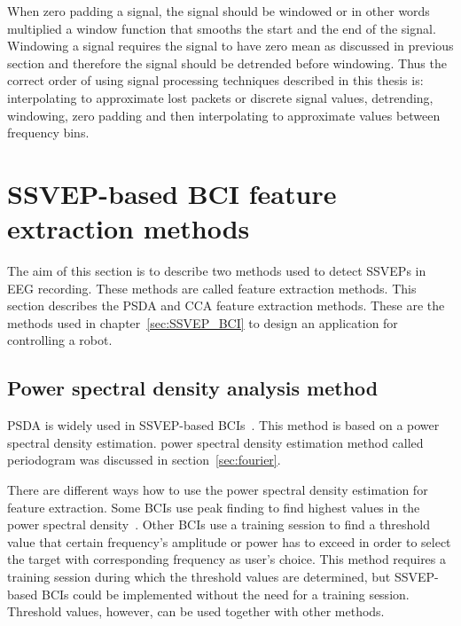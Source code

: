 When zero padding a signal, the signal should be windowed or in other words multiplied a window function that smooths the start and the end of the signal. Windowing a signal requires the signal to have zero mean as discussed in previous section and therefore the signal should be detrended before windowing. Thus the correct order of using signal processing techniques described in this thesis is: interpolating to approximate lost packets or discrete signal values, detrending, windowing, zero padding and then interpolating to approximate values between \glspl{frequency bin}.

\section{SSVEP-based BCI feature extraction methods}
\label{sec:SSVEP_detection}
The aim of this section is to describe two methods used to detect \glspl{SSVEP} in \gls{EEG} recording. These methods are called \gls{feature extraction} methods. This section describes the \gls{PSDA} and \gls{CCA} \gls{feature extraction} methods. These are the methods used in chapter~\ref{sec:SSVEP_BCI} to design an application for controlling a robot. %

\subsection{Power spectral density analysis method}

\Gls{PSDA} is widely used in \gls{SSVEP}-based \glspl{BCI}~\cite{bin2009cca}. This method is based on a \gls{power spectral density} estimation. \Gls{power spectral density} estimation method called \gls{periodogram} was discussed in section~\ref{sec:fourier}.

There are different ways how to use the \gls{power spectral density} estimation for \gls{feature extraction}. Some \glspl{BCI} use peak finding to find highest values in the \gls{power spectral density}~\cite{cca_lin}. Other \glspl{BCI} use a training session to find a threshold value that certain frequency's amplitude or power has to exceed in order to select the \gls{target} with corresponding frequency as user's choice. This method requires a training session during which the threshold values are determined, but \gls{SSVEP}-based \glspl{BCI} could be implemented without the need for a training session. Threshold values, however, can be used together with other methods. 


